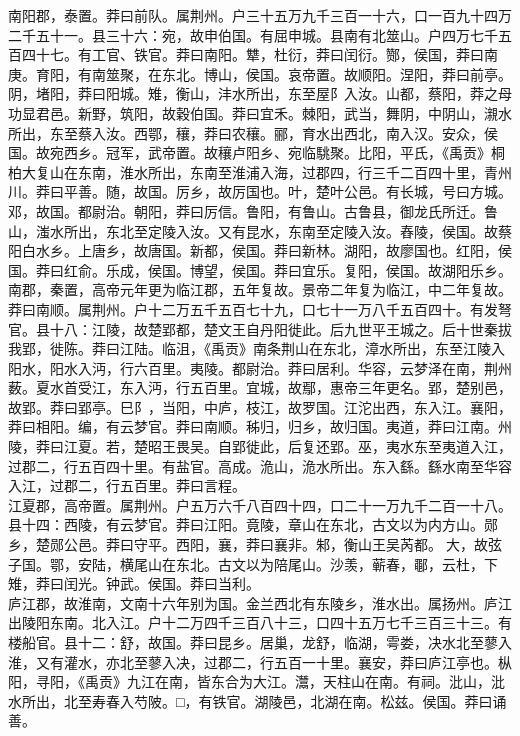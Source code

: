 \documentclass[]{article}
\begin{document}
南阳郡，泰置。莽曰前队。属荆州。户三十五万九千三百一十六，口一百九十四万二千五十一。县三十六：宛，故申伯国。有屈申城。县南有北筮山。户四万七千五百四十七。有工官、铁官。莽曰南阳。犨，杜衍，莽曰闰衍。酂，侯国，莽曰南庚。育阳，有南筮聚，在东北。博山，侯国。哀帝置。故顺阳。涅阳，莽曰前亭。阴，堵阳，莽曰阳城。雉，衡山，沣水所出，东至屋阝入汝。山都，蔡阳，莽之母功显君邑。新野，筑阳，故穀伯国。莽曰宜禾。棘阳，武当，舞阴，中阴山，瀙水所出，东至蔡入汝。西鄂，穰，莽曰农穰。郦，育水出西北，南入汉。安众，侯国。故宛西乡。冠军，武帝置。故穰卢阳乡、宛临駣聚。比阳，平氏，《禹贡》桐柏大复山在东南，淮水所出，东南至淮浦入海，过郡四，行三千二百四十里，青州川。莽曰平善。随，故国。厉乡，故厉国也。叶，楚叶公邑。有长城，号曰方城。邓，故国。都尉治。朝阳，莽曰厉信。鲁阳，有鲁山。古鲁县，御龙氏所迁。鲁山，滍水所出，东北至定陵入汝。又有昆水，东南至定陵入汝。舂陵，侯国。故蔡阳白水乡。上唐乡，故唐国。新都，侯国。莽曰新林。湖阳，故廖国也。红阳，侯国。莽曰红俞。乐成，侯国。博望，侯国。莽曰宜乐。复阳，侯国。故湖阳乐乡。\\
南郡，秦置，高帝元年更为临江郡，五年复故。景帝二年复为临江，中二年复故。莽曰南顺。属荆州。户十二万五千五百七十九，口七十一万八千五百四十。有发弩官。县十八：江陵，故楚郢都，楚文王自丹阳徙此。后九世平王城之。后十世秦拔我郢，徙陈。莽曰江陆。临沮，《禹贡》南条荆山在东北，漳水所出，东至江陵入阳水，阳水入沔，行六百里。夷陵。都尉治。莽曰居利。华容，云梦泽在南，荆州薮。夏水首受江，东入沔，行五百里。宜城，故鄢，惠帝三年更名。郢，楚别邑，故郢。莽曰郢亭。巳阝，当阳，中庐，枝江，故罗国。江沱出西，东入江。襄阳，莽曰相阳。编，有云梦官。莽曰南顺。秭归，归乡，故归国。夷道，莽曰江南。州陵，莽曰江夏。若，楚昭王畏吴。自郢徙此，后复还郢。巫，夷水东至夷道入江，过郡二，行五百四十里。有盐官。高成。洈山，洈水所出。东入繇。繇水南至华容入江，过郡二，行五百里。莽曰言程。\\
江夏郡，高帝置。属荆州。户五万六千八百四十四，口二十一万九千二百一十八。县十四：西陵，有云梦官。莽曰江阳。竟陵，章山在东北，古文以为内方山。郧乡，楚郧公邑。莽曰守平。西阳，襄，莽曰襄非。邾，衡山王吴芮都。大，故弦子国。鄂，安陆，横尾山在东北。古文以为陪尾山。沙羡，蕲春，鄳，云杜，下雉，莽曰闰光。钟武。侯国。莽曰当利。\\
庐江郡，故淮南，文南十六年别为国。金兰西北有东陵乡，淮水出。属扬州。庐江出陵阳东南。北入江。户十二万四千三百八十三，口四十五万七千三百三十三。有楼船官。县十二：舒，故国。莽曰昆乡。居巢，龙舒，临湖，雩娄，决水北至蓼入淮，又有灌水，亦北至蓼入决，过郡二，行五百一十里。襄安，莽曰庐江亭也。枞阳，寻阳，《禹贡》九江在南，皆东合为大江。灊，天柱山在南。有祠。沘山，沘水所出，北至寿春入芍陂。□，有铁官。湖陵邑，北湖在南。松兹。侯国。莽曰诵善。\\
\end{document}
